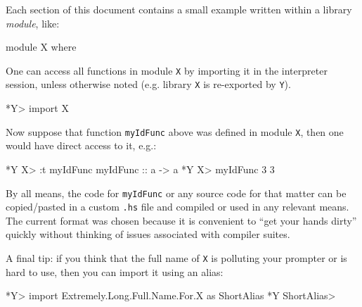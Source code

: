 Each section of this document contains a small example written within a library \emph{module}, like:
\begin{code}
module X where
\end{code}
One can access all functions in module \texttt{X} by importing it in the interpreter session, unless otherwise noted (e.g. library \texttt{X} is re-exported by \texttt{Y}).
\begin{interactive}
*Y> import X
\end{interactive}
Now suppose that function \texttt{myIdFunc} above was defined in module \texttt{X}, then one would have direct access to it, e.g.:
\begin{interactive}
*Y X> :t myIdFunc
myIdFunc :: a -> a
*Y X> myIdFunc 3
3  
\end{interactive}
By all means, the code for \texttt{myIdFunc} or any source code for that matter can be copied/pasted in a custom \texttt{.hs} file and compiled or used in any relevant means. The current format was chosen because it is convenient to ``get your hands dirty'' quickly without thinking of issues associated with compiler suites.

A final tip: if you think that the full name of \texttt{X} is polluting your prompter or is hard to use, then you can import it using an alias:
\begin{interactive}
*Y> import Extremely.Long.Full.Name.For.X as ShortAlias
*Y ShortAlias> 
\end{interactive}